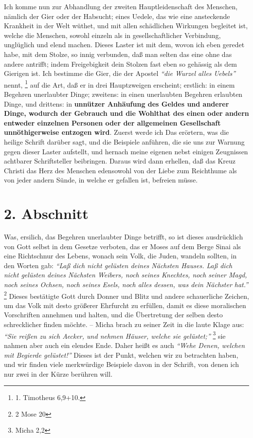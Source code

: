 Ich komme nun zur Abhandlung der zweiten Hauptleidenschaft des Menschen, nämlich
der Gier oder der Habsucht; eines Uedele, das wie eine ansteckende Krankheit
in der Welt wüthet, und mit allen schädlichen Wirkungen begleitet ist, welche
die Menschen, sowohl einzeln als in gesellschaftlicher Verbindung, unglüglich
und elend machen. Dieses Laster ist mit dem, wovon ich eben geredet habe, mit
dem Stolze, so innig verbunden, daß man selten das eine ohne das andere
antrifft; indem Freigebigkeit dein Stolzen fast eben so gehässig als dem
Gierigen ist. Ich bestimme die Gier, die der Apostel
\textit{"`die Wurzel alles
Uebels"'} nennt,
\footnote{1. Timotheus 6,9+10.}
auf die Art, daß er in drei
Hauptzweigen erscheint; erstlich: in einem Begehren unerlaubter Dinge; zweitens:
in einen unerlaubten Begehren erlaubten Dinge, und drittens: in \textbf{unnützer
Anhäufung des Geldes und anderer Dinge, wodurch der Gebrauch und die Wohlthat
des einen oder andern entweder einzelnen Personen oder der allgemeinen
Gesellschaft unnöthigerweise entzogen wird}. Zuerst werde ich Das erörtern, was
die heilige Schrift darüber sagt, und die Beispiele anführen, die sie uns zur
Warnung gegen dieser Laster aufstellt, und hernach meine eigenen nebst einigen
Zeugnissen achtbarer Schriftsteller beibringen. Daraus wird dann erhellen, daß
das Kreuz Christi das Herz des Menschen edensowohl von der Liebe zum Reichthume
als von jeder andern Sünde, in welche er gefallen ist, befreien müsse.

\section{2. Abschnitt} \label{kap13_ab2} 

Was, ersilich, das Begehren unerlaubter Dinge betrifft, so ist dieses
ausdrücklich von Gott selbst in dem Gesetze verboten, das er Moses auf dem
Berge Sinai als eine Richtschnur des Lebens, wonach sein Volk, die Juden,
wandeln sollten, in den Worten gab:
\textit{"`Laß dich nicht gelüsten deines Nächsten
Hauses. Laß dich nicht gelüsten deines Nächsten Weibers, noch seines Knechtes,
noch seiner Magd, noch seines Ochsen, noch seines Esels, noch alles dessen, was
dein Nächster hat."'}
\footnote{2 Mose 20}
Dieses bestätigte Gott durch Donner und
Blitz und andere schauerliche Zeichen, um das Volk mit desto größerer Ehrfurcht
zu erfüllen, damit es diese moralischen Vorschriften annehmen und halten, und
die Übertretung der selben desto schrecklicher finden möchte. -- Micha brach zu
seiner Zeit in die laute Klage aus:
\textit{"`Sie reißen zu sich Aecker, und nehmen
Häuser, welche sie gelüstet;"'}
\footnote{Micha 2,2}
sie nahmen aber auch ein
elendes Ende. Daher heißt es auch
\textit{"`Wehe Denen, welchen mit Begierde gelüstet!"'}
Dieses ist der Punkt, welchen wir zu betrachten haben, und wir finden viele
merkwürdige Beispiele davon in der Schrift, von denen ich nur zwei in der Kürze
berühren will.

